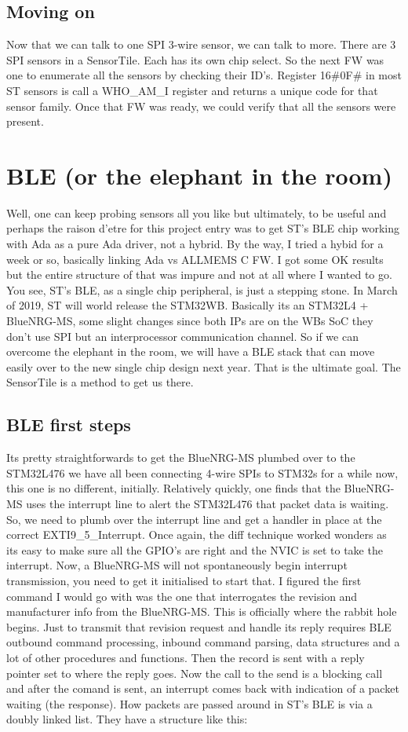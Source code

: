 \documentclass[11pt]{article}
\numberwithin{figure}{section}
\begin{document}
{
\selectfont

}

\subsection{Moving on}
Now that we can talk to one SPI 3-wire sensor, we can talk to
more. There are 3 SPI sensors in a SensorTile. Each has its own chip
select. So the next FW was one to enumerate all the sensors by
checking their ID's. Register 16\#0F\# in most ST sensors is call a
WHO\_AM\_I register and returns a unique code for that sensor
family. Once that FW was ready, we could verify that all the sensors
were present.
\section{BLE (or the elephant in the room)}
Well, one can keep probing sensors all you like but ultimately, to be
useful and perhaps the raison d'etre for this project entry was to get
ST's BLE chip working with Ada as a pure Ada driver, not a
hybrid. By the way, I tried a hybid for a week or so, basically
linking Ada vs ALLMEMS C FW. I got some OK results but the entire
structure of that was impure and not at all where I wanted to go. You
see, ST's BLE, as a single chip peripheral, is just a stepping
stone. In March of 2019, ST will world release the STM32WB. Basically
its an STM32L4 + BlueNRG-MS, some slight changes since both IPs are
on the WBs SoC they don't use SPI but an interprocessor communication
channel. So if we can overcome the elephant in the room, we will have
a BLE stack that can move easily over to the new single chip design
next year. That is the ultimate goal. The SensorTile is a method to
get us there.
\subsection{BLE first steps}
Its pretty straightforwards to get the BlueNRG-MS plumbed over to the
STM32L476 we have all been connecting 4-wire SPIs to STM32s for a
while now, this one is no different, initially. Relatively quickly,
one finds that the BlueNRG-MS uses the interrupt line to alert the
STM32L476 that packet data is waiting. So, we need to plumb over the
interrupt line and get a handler in place at the correct
EXTI9\_5\_Interrupt. Once again, the diff technique worked wonders as
its easy to make sure all the GPIO's are right and the NVIC is set to
take the interrupt. Now, a BlueNRG-MS will not spontaneously begin
interrupt transmission, you need to get it initialised to start
that. I figured the first command I would go with was the one that
interrogates the revision and manufacturer info from the
BlueNRG-MS. This is officially where the rabbit hole begins. Just to
transmit that revision request and handle its reply requires BLE
outbound command processing, inbound command parsing, data structures
and a lot of other procedures and functions. Then the record is sent
with a reply pointer set to where the reply goes. Now the call to the
send is a blocking call and after the comand is sent, an interrupt
comes back with indication of a packet waiting (the response). How
packets are passed around in ST's BLE is via a doubly linked
list. They have a structure like this:
\end{document}
